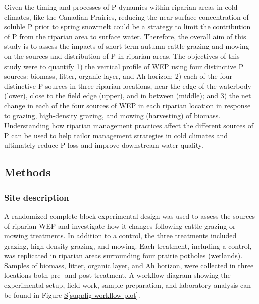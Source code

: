 \documentclass[
]{agujournal2019}
\newcommand*\quartosuppfigref[1]{Figure \hyperref[#1]{S\ref{#1}}}
\begin{document}
Given the timing and processes of P dynamics within riparian areas in
cold climates, like the Canadian Prairies, reducing the near-surface
concentration of soluble P prior to spring snowmelt could be a strategy
to limit the contribution of P from the riparian area to surface water.
Therefore, the overall aim of this study is to assess the impacts of
short-term autumn cattle grazing and mowing on the sources and
distribution of P in riparian areas. The objectives of this study were
to quantify 1) the vertical profile of WEP using four distinctive P
sources: biomass, litter, organic layer, and Ah horizon; 2) each of the
four distinctive P sources in three riparian locations, near the edge of
the waterbody (lower), close to the field edge (upper), and in between
(middle); and 3) the net change in each of the four sources of WEP in
each riparian location in response to grazing, high-density grazing, and
mowing (harvesting) of biomass. Understanding how riparian management
practices affect the different sources of P can be used to help tailor
management strategies in cold climates and ultimately reduce P loss and
improve downstream water quality.

\subsection{Methods}\label{methods}

\subsubsection{Site description}\label{site-description}

A randomized complete block experimental design was used to assess the
sources of riparian WEP and investigate how it changes following cattle
grazing or mowing treatments. In addition to a control, the three
treatments included grazing, high-density grazing, and mowing. Each
treatment, including a control, was replicated in riparian areas
surrounding four prairie potholes (wetlands). Samples of biomass,
litter, organic layer, and Ah horizon, were collected in three locations
both pre- and post-treatment. A workflow diagram showing the
experimental setup, field work, sample preparation, and laboratory
analysis can be found in \quartosuppfigref{suppfig-workflow-plot}.
\end{document}
